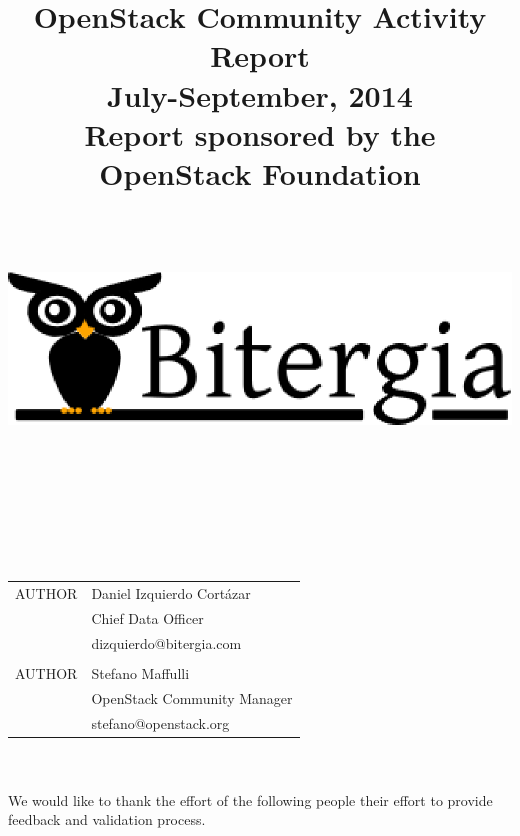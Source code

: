 \documentclass[a4wide,11pt]{report}
\begin{document}
\title{OpenStack Community Activity Report\\
      July-September, 2014 \\
      Report sponsored by the OpenStack Foundation\\
        ~~\\~~\\  \includegraphics[scale=.35]{logo.eps}       \\}




\maketitle


\newpage
~~\\~\\~\\~\\
\begin{tabular}{p{5cm}p{10cm}}
AUTHOR & Daniel Izquierdo Cort\'azar \\
       & Chief Data Officer  \\
       & dizquierdo@bitergia.com \\
       &  \\
AUTHOR  & Stefano Maffulli \\
        & OpenStack Community Manager \\
        & stefano@openstack.org \\
\end{tabular}

~~\\~~\\

We would like to thank the effort of the following people their effort to provide feedback and validation process. 

~~\\
~~\\
\end{document}
